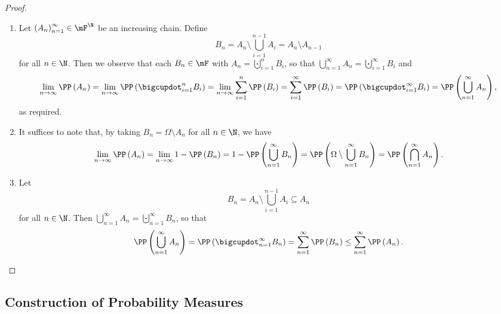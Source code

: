 \documentclass[stat901]{subfiles}
\begin{document}
\begin{proof}
\begin{enumerate}
            \item Let $\left( A_{n} \right)^{\infty}_{n=1}\in\mF^{\N}$ be an increasing chain. Define
                \begin{equation*}
                    B_n = A_n\setminus \bigcup^{n-1}_{i=1} A_i = A_n \setminus A_{n-1}
                \end{equation*}
                for all $n\in\N$. Then we observe that each $B_n\in\mF$ with $A_n = \bigcupdot^{n}_{i=1}B_i$, so that $\bigcup^{\infty}_{n=1}A_n = \bigcupdot^{\infty}_{i=1}B_i$ and
                \begin{equation*}
                    \lim_{n\to\infty} \PP\left( A_n \right) = \lim_{n\to\infty}\PP\left( \bigcupdot^{n}_{i=1} B_i \right) = \lim_{n\to\infty}\sum^{n}_{i=1} \PP\left( B_i \right) = \sum^{\infty}_{i=1}\PP\left( B_i \right) = \PP\left( \bigcupdot^{\infty}_{i=1}B_i \right) = \PP\left( \bigcup^{\infty}_{n=1}A_n \right),
                \end{equation*}
                as required.

            \item It suffices to note that, by taking $B_n = \Omega\setminus A_n$ for all $n\in\N$, we have
                \begin{equation*}
                    \lim_{n\to\infty} \PP\left( A_n \right) = \lim_{n\to\infty} 1-\PP\left( B_n \right) = 1-\PP\left( \bigcup^{\infty}_{n=1} B_n \right) = \PP\left( \Omega\setminus \bigcup^{\infty}_{n=1}B_n \right) = \PP\left( \bigcap^{\infty}_{n=1}A_n \right).
                \end{equation*}

            \item Let
                \begin{equation*}
                    B_n = A_n \setminus \bigcup^{n-1}_{i=1} A_i \subseteq A_n
                \end{equation*}
                for all $n\in\N$. Then $\bigcup^{\infty}_{n=1} A_n = \bigcupdot^{\infty}_{n=1}B_n$, so that
                \begin{equation*}
                    \PP\left( \bigcup^{\infty}_{n=1} A_n \right) = \PP\left( \bigcupdot^{\infty}_{n=1}B_n \right) = \sum^{\infty}_{n=1} \PP\left( B_n \right) \leq \sum^{\infty}_{n=1}\PP\left( A_n \right).
                \end{equation*}
        \end{enumerate}
    \end{proof}

    \subsection{Construction of Probability Measures}
\end{document}

